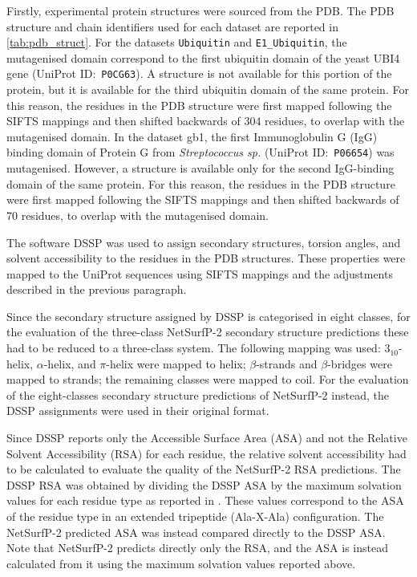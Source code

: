 Firstly, experimental protein structures were sourced from the PDB.\@
The PDB structure and chain identifiers used for each dataset are reported in \autoref{tab:pdb_struct}.
For the datasets \texttt{Ubiquitin} and \texttt{E1\_Ubiquitin}, the mutagenised domain correspond to the first ubiquitin domain of the yeast UBI4 gene (UniProt ID:~\texttt{P0CG63}).
A structure is not available for this portion of the protein, but it is available for the third ubiquitin domain of the same protein.
For this reason, the residues in the PDB structure were first mapped following the SIFTS mappings and then shifted backwards of \num{304} residues, to overlap with the mutagenised domain.
In the dataset gb1, the first Immunoglobulin G (IgG) binding domain of Protein G from \textit{Streptococcus sp.} (UniProt ID:~\texttt{P06654}) was mutagenised.
However, a structure is available only for the second IgG-binding domain of the same protein.
For this reason, the residues in the PDB structure were first mapped following the SIFTS mappings and then shifted backwards of \num{70} residues, to overlap with the mutagenised domain.

The software DSSP was used to assign secondary structures, torsion angles, and solvent accessibility to the residues in the PDB structures.
These properties were mapped to the UniProt sequences using SIFTS mappings and the adjustments described in the previous paragraph.

Since the secondary structure assigned by DSSP is categorised in eight classes, for the evaluation of the three-class NetSurfP-2 secondary structure predictions these had to be reduced to a three-class system.
The following mapping was used: $3_{10}$-helix, $\alpha$-helix, and $\pi$-helix were mapped to helix; $\beta$-strands and $\beta$-bridges were mapped to strands; the remaining classes were mapped to coil.
For the evaluation of the eight-classes secondary structure predictions of NetSurfP-2 instead, the DSSP assignments were used in their original format.

Since DSSP reports only the Accessible Surface Area (ASA) and not the Relative Solvent Accessibility (RSA) for each residue, the relative solvent accessibility had to be calculated to evaluate the quality of the NetSurfP-2 RSA predictions.
The DSSP RSA was obtained by dividing the DSSP ASA by the maximum solvation values for each residue type as reported in \textcite{Ahmad2003}.
These values correspond to the ASA of the residue type in an extended tripeptide (Ala-X-Ala) configuration.
The NetSurfP-2 predicted ASA was instead compared directly to the DSSP ASA.\@
Note that NetSurfP-2 predicts directly only the RSA, and the ASA is instead calculated from it using the maximum solvation values reported above.

